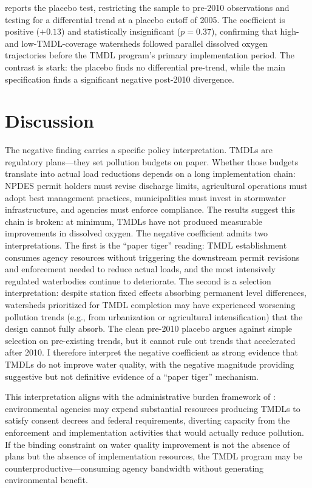 \documentclass[12pt]{article}
\begin{document}
 reports the placebo test, restricting the sample to pre-2010 observations and testing for a differential trend at a placebo cutoff of 2005. The coefficient is positive ($+0.13$) and statistically insignificant ($p = 0.37$), confirming that high- and low-TMDL-coverage watersheds followed parallel dissolved oxygen trajectories before the TMDL program's primary implementation period. The contrast is stark: the placebo finds no differential pre-trend, while the main specification finds a significant negative post-2010 divergence.


\section{Discussion}
\label{sec:discussion}

The negative finding carries a specific policy interpretation. TMDLs are regulatory plans---they set pollution budgets on paper. Whether those budgets translate into actual load reductions depends on a long implementation chain: NPDES permit holders must revise discharge limits, agricultural operations must adopt best management practices, municipalities must invest in stormwater infrastructure, and agencies must enforce compliance. The results suggest this chain is broken: at minimum, TMDLs have not produced measurable improvements in dissolved oxygen. The negative coefficient admits two interpretations. The first is the ``paper tiger'' reading: TMDL establishment consumes agency resources without triggering the downstream permit revisions and enforcement needed to reduce actual loads, and the most intensively regulated waterbodies continue to deteriorate. The second is a selection interpretation: despite station fixed effects absorbing permanent level differences, watersheds prioritized for TMDL completion may have experienced worsening pollution trends (e.g., from urbanization or agricultural intensification) that the design cannot fully absorb. The clean pre-2010 placebo argues against simple selection on pre-existing trends, but it cannot rule out trends that accelerated after 2010. I therefore interpret the negative coefficient as strong evidence that TMDLs do not improve water quality, with the negative magnitude providing suggestive but not definitive evidence of a ``paper tiger'' mechanism.

This interpretation aligns with the administrative burden framework of \citet{herd2018}: environmental agencies may expend substantial resources producing TMDLs to satisfy consent decrees and federal requirements, diverting capacity from the enforcement and implementation activities that would actually reduce pollution. If the binding constraint on water quality improvement is not the absence of plans but the absence of implementation resources, the TMDL program may be counterproductive---consuming agency bandwidth without generating environmental benefit.
\end{document}
